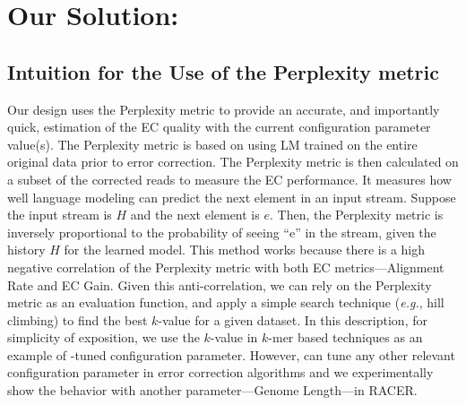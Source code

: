 \section{Our Solution: {\bf \name}}
\subsection{Intuition for the Use of the Perplexity metric}
Our design uses the Perplexity metric to provide an accurate, and importantly quick, estimation of the EC quality with the current configuration parameter value(s). %
The Perplexity metric is based on using LM trained on the entire original data prior to error correction.
The Perplexity metric is then calculated on a subset of the corrected reads to measure the  EC performance. It measures how well language modeling can predict the next element in an input stream. Suppose the input stream is $H$ and the next element is $e$. Then, the Perplexity metric is inversely proportional to the probability of seeing ``e'' in the stream, given the history $H$ for the learned model.
This method works because there is a high negative correlation of the Perplexity metric with both EC metrics---Alignment Rate and EC Gain.
Given this anti-correlation, we can rely on the Perplexity metric as an evaluation function, and apply a simple search technique (\textit{e.g.}, hill climbing) to find the best $k$-value for a given dataset. In this description, for simplicity of exposition, we use the $k$-value in $k$-mer based techniques as an example of \name-tuned configuration parameter. However, \name can tune any other relevant configuration parameter in error correction algorithms and we experimentally show the behavior with another parameter---Genome Length---in RACER. 
